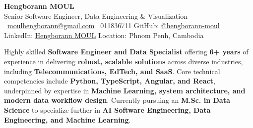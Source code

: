\documentclass[11pt,a4paper]{article}
\begin{document}

{\Huge\bfseries Hengborann MOUL}\\[4pt]
{\large\color{accentblue} Senior Software Engineer, Data Engineering \& Visualization}\\[6pt]
\small
\Letter\ \href{mailto:moulhengborann@gmail.com}{moulhengborann@gmail.com}\quad
\Telefon\ 011836711\quad
\textsf{GitHub:} \href{https://github.com/hengborann-moul}{@hengborann-moul}\quad
\\\textsf{LinkedIn:} \href{https://www.linkedin.com/in/hengborann-moul}{Hengborann MOUL}\quad
\textsf{Location:} Phnom Penh, Cambodia

\vspace{10pt}
\noindent Highly skilled \textbf{Software Engineer and Data Specialist} offering \textbf{6+ years} of experience in delivering \textbf{robust, scalable solutions} across diverse industries, including \textbf{Telecommunications, EdTech, and SaaS}. Core technical competencies include \textbf{Python, TypeScript, Angular, and React}, underpinned by expertise in \textbf{Machine Learning, system architecture, and modern data workflow design}. Currently pursuing an \textbf{M.Sc. in Data Science} to specialize further in \textbf{AI Software Engineering, Data Engineering, and Machine Learning}.

\vspace{6pt}

\setlength{\columnsep}{1.2em}
\end{document}
